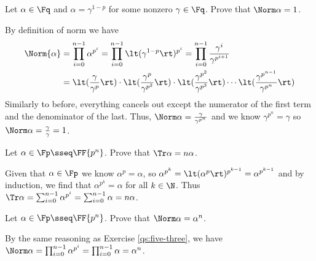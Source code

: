 \documentclass{article}
\begin{document}
\begin{subexercise} %
Let \( \alpha\in\Fq \) and \( \alpha=\gamma^{1-p} \) for some nonzero \( \gamma\in\Fq \).
Prove that \( \Norm \alpha = 1 \).
\end{subexercise}
\begin{solution}
By definition of norm we have \begin{align*}
  \Norm{\alpha} &= \prod_{i=0}^{n-1} \alpha^{p^i} = \prod_{i=0}^{n-1} \lt(\gamma^{1-p}\rt)^{p^i} = \prod_{i=0}^{n-1} \frac{\gamma^i}{\gamma^{p^{i+1}}} \\
  &= \lt(\frac{\gamma}{\gamma^p}\rt) \cdot \lt(\frac{\gamma^p}{\gamma^{p^2}}\rt) \cdot \lt(\frac{\gamma^{p^2}}{\gamma^{p^3}}\rt) \cdots \lt(\frac{\gamma^{p^{n-1}}}{\gamma^{p^n}}\rt)
\end{align*}
Similarly to before, everything cancels out except the numerator of the first term and the denominator of the last.
Thus, \( \Norm \alpha = \frac{\gamma}{\gamma^{p^n}} \) and we know \( \gamma^{p^n} = \gamma \) so \( \Norm \alpha = \frac{\gamma}{\gamma} = 1 \).
\end{solution}

\begin{subexercise} %
  \label{qs:five-three}
  Let \( \alpha\in\Fp \sseq \FF{p^n} \).
  Prove that \( \Tr \alpha = n\alpha \).
\end{subexercise}
\begin{solution}
Given that \( \alpha\in\Fp \) we know \( \alpha^p = \alpha \), so \( \alpha^{p^k} = \lt(\alpha^{p}\rt)^{p^{k-1}} = \alpha^{p^{k-1}} \) and by induction, we find that \( \alpha^{p^k} = \alpha \) for all \( k\in\N \).
Thus \( \Tr \alpha = \sum_{i=0}^{n-1} \alpha^{p^i} = \sum_{i=0}^{n-1} \alpha = n\alpha \).
\end{solution}

\begin{subexercise} %
  Let \( \alpha\in\Fp \sseq \FF{p^n} \).
  Prove that \( \Norm \alpha = \alpha^n \).
\end{subexercise}
\begin{solution}
  By the same reasoning as Exercise \ref{qs:five-three}, we have \( \Norm \alpha = \prod_{i=0}^{n-1} \alpha^{p^i} = \prod_{i=0}^{n-1} \alpha = \alpha^n \).
\end{solution}
\end{document}
